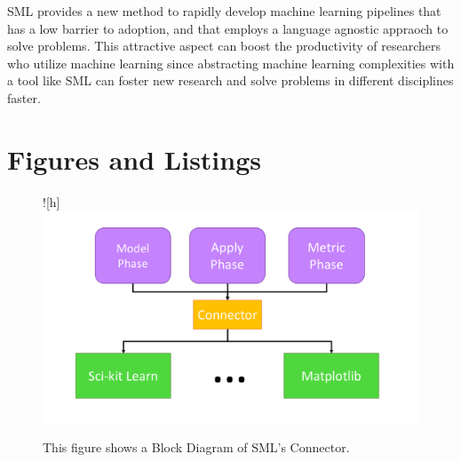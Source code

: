 SML provides a new method to rapidly develop machine learning pipelines that has a low barrier to adoption, and that employs a language agnostic appraoch to solve problems. This attractive aspect can boost the productivity of researchers who utilize machine learning since abstracting machine learning complexities with a tool like SML can foster new research and solve problems in different disciplines faster.

\clearpage

\section{Figures and Listings}



\begin{figure}![h]
\includegraphics[width=1\textwidth]{figures/SML/connector.png}
\centering
\caption{This figure shows a Block Diagram of SML's Connector.}
\label{fig:SML:Connector}
\end{figure}

